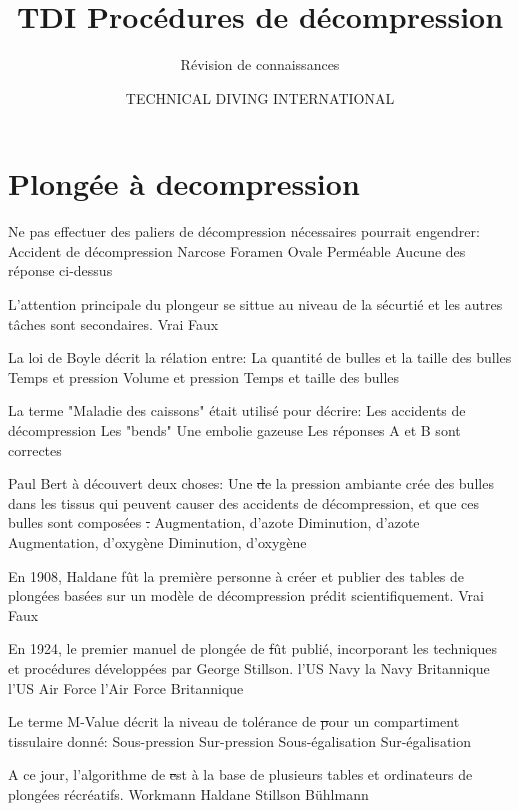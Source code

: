 \documentclass[english,10pt,a4paper,twoside]{article}
\title{TDI Procédures de décompression}
\subtitle{Révision de connaissances}
\author{TECHNICAL DIVING INTERNATIONAL}
\begin{document}
\sloppy


	\section{Plongée à decompression}

	\begin{outline}
		\1 Ne pas effectuer des paliers de décompression nécessaires pourrait engendrer:
			\2 Accident de décompression
			\2 Narcose
			\2 Foramen Ovale Perméable
			\2 Aucune des réponse ci-dessus

		\1 L'attention principale du plongeur se sittue au niveau de la sécurtié et les autres tâches sont secondaires.
			\2 Vrai
			\2 Faux

		\1 La loi de Boyle décrit la rélation entre:
			\2 La quantité de bulles et la taille des bulles
			\2 Temps et pression
			\2 Volume et pression
			\2 Temps et taille des bulles

		\1 La terme "Maladie des caissons" était utilisé pour décrire:
			\2 Les accidents de décompression
			\2 Les "bends"
			\2 Une embolie gazeuse
			\2 Les réponses A et B sont correctes

		\1 Paul Bert à découvert deux choses: Une \st de la pression ambiante crée des bulles dans les tissus qui peuvent causer des accidents de décompression, et que ces bulles sont composées \st.
			\2 Augmentation, d'azote
			\2 Diminution, d'azote
			\2 Augmentation, d'oxygène
			\2 Diminution, d'oxygène

		\1 En 1908, Haldane fût la première personne à créer et publier des tables de plongées basées sur un modèle de décompression prédit scientifiquement.
			\2 Vrai
			\2 Faux

		\1 En 1924, le premier manuel de plongée de \st fût publié, incorporant les techniques et procédures développées par George Stillson.
			\2 l'US Navy
			\2 la Navy Britannique
			\2 l'US Air Force
			\2 l'Air Force Britannique

		\1 Le terme M-Value décrit la niveau de tolérance de \st pour un compartiment tissulaire donné:
			\2 Sous-pression
			\2 Sur-pression
			\2 Sous-égalisation
			\2 Sur-égalisation

		\1 A ce jour, l'algorithme de \st est à la base de plusieurs tables et ordinateurs de plongées récréatifs.
			\2 Workmann
			\2 Haldane
			\2 Stillson
			\2 Bühlmann
	\end{outline}
	\vfill
	\pagebreak
\end{document}
